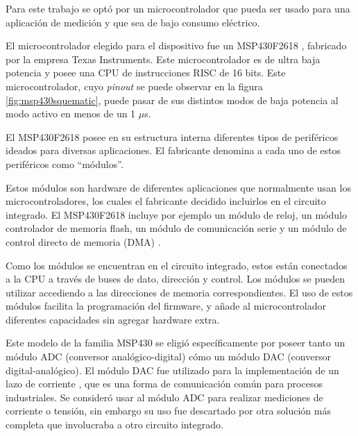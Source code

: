 Para este trabajo se optó por un microcontrolador que pueda ser usado para una aplicación de medición y que sea de bajo consumo eléctrico. 


El microcontrolador elegido para el dispositivo fue un MSP430F2618 \cite{msp430freff}, fabricado por la empresa Texas Instruments. Este microcontrolador es de ultra baja potencia y posee una CPU de instrucciones RISC de 16 bits. Este microcontrolador, cuyo \textit{pinout} se puede observar en la figura \ref{fig:msp430squematic}, puede pasar de sus distintos modos de baja potencia al modo activo en menos de un 1 $\mu$s.



El MSP430F2618 posee en su estructura interna diferentes tipos de periféricos ideados para diversas aplicaciones. El fabricante denomina a cada uno de estos periféricos como \textquotedblleft módulos\textquotedblright .
 
Estos módulos son hardware de diferentes aplicaciones que normalmente usan los microcontroladores, los cuales el fabricante decidido incluirlos en el circuito integrado. El MSP430F2618 incluye por ejemplo un módulo de reloj, un módulo controlador de memoria flash, un módulo de comunicación serie y un módulo de control directo de memoria (DMA) \cite{msp430slau144j}. 

Como los módulos se encuentran en el circuito integrado, estos están conectados a la CPU a través de buses de dato, dirección y control. Los módulos se pueden utilizar  accediendo a las direcciones de memoria correspondientes. El uso de estos módulos facilita la programación del firmware, y añade al microcontrolador diferentes capacidades sin agregar hardware extra.


Este modelo de la familia MSP430 \citep{msp430family} se eligió específicamente por poseer tanto un módulo ADC (conversor analógico-digital) cómo un módulo DAC (conversor digital-analógico). El módulo DAC fue utilizado para la implementación de un lazo de corriente \citep{liptak2018instrument}, que es una forma de comunicación común para procesos industriales. Se consideró usar al módulo ADC para realizar mediciones de corriente o tensión, sin embargo su uso fue descartado por otra solución más completa que involucraba a otro circuito integrado.

